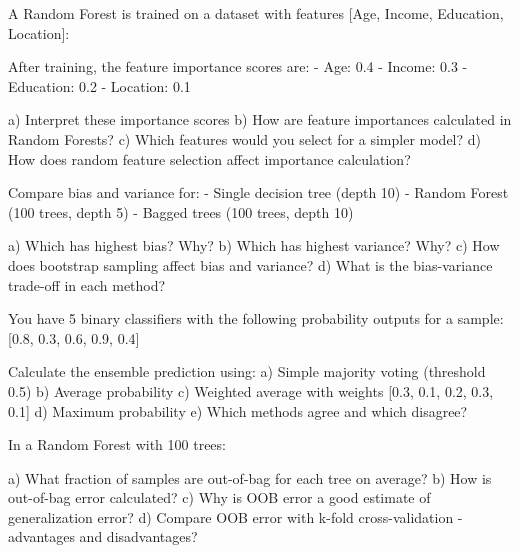\documentclass{article}
\newcounter{exercise}
\begin{document}
\begin{tcolorbox}[colback=gray!5!white,colframe=gray!75!black,title=Problem \stepcounter{exercise}: Feature Importance in Random Forests]

A Random Forest is trained on a dataset with features [Age, Income, Education, Location]:

After training, the feature importance scores are:
- Age: 0.4
- Income: 0.3  
- Education: 0.2
- Location: 0.1

a) Interpret these importance scores
b) How are feature importances calculated in Random Forests?
c) Which features would you select for a simpler model?
d) How does random feature selection affect importance calculation?
\end{tcolorbox}

\begin{tcolorbox}[colback=gray!5!white,colframe=gray!75!black,title=Problem \stepcounter{exercise}: Bias-Variance in Ensembles]

Compare bias and variance for:
- Single decision tree (depth 10)
- Random Forest (100 trees, depth 5)
- Bagged trees (100 trees, depth 10)

a) Which has highest bias? Why?
b) Which has highest variance? Why?
c) How does bootstrap sampling affect bias and variance?
d) What is the bias-variance trade-off in each method?
\end{tcolorbox}

\begin{tcolorbox}[colback=gray!5!white,colframe=gray!75!black,title=Problem \stepcounter{exercise}: Ensemble Combination Methods]

You have 5 binary classifiers with the following probability outputs for a sample:
[0.8, 0.3, 0.6, 0.9, 0.4]

Calculate the ensemble prediction using:
a) Simple majority voting (threshold 0.5)
b) Average probability  
c) Weighted average with weights [0.3, 0.1, 0.2, 0.3, 0.1]
d) Maximum probability
e) Which methods agree and which disagree?
\end{tcolorbox}

\begin{tcolorbox}[colback=gray!5!white,colframe=gray!75!black,title=Problem \stepcounter{exercise}: Out-of-Bag Error Estimation]

In a Random Forest with 100 trees:

a) What fraction of samples are out-of-bag for each tree on average?
b) How is out-of-bag error calculated?
c) Why is OOB error a good estimate of generalization error?
d) Compare OOB error with k-fold cross-validation - advantages and disadvantages?
\end{tcolorbox}
\end{document}
